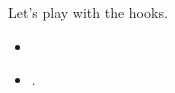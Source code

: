 \documentclass{article}
\begin{document}
Let's play with the hooks.

\begin{itemize}
    \item {}

    \item {}.
\end{itemize}
\end{document}
